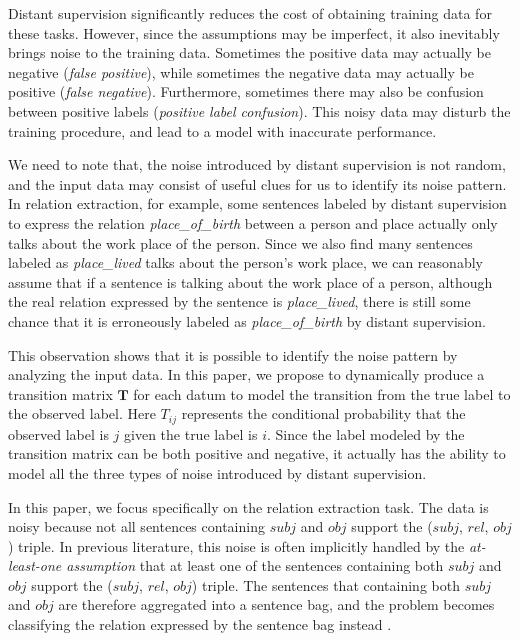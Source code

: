 
Distant supervision significantly reduces the cost of obtaining training data for these tasks. However, since the assumptions may be imperfect, it also inevitably brings noise to the training data.  Sometimes the positive data may actually be negative (\emph{false positive}), while sometimes the negative data may actually be positive (\emph{false negative}). Furthermore, sometimes there may also be confusion between positive labels (\emph{positive label confusion}). This noisy data may disturb the training procedure, and lead to a model with inaccurate performance.

We need to note that, the noise introduced by distant supervision is not random, and the input data may consist of useful clues for us to identify its noise pattern. In relation extraction, for example, some sentences labeled by distant supervision to express the relation \emph{place\_of\_birth} between a person and place actually only talks about the work place of the person. Since we also find many sentences labeled as \emph{place\_lived} talks about the person's work place, we can reasonably assume that if a sentence is talking about the work place of a person, although the real relation expressed by the sentence is \emph{place\_lived}, there is still some chance that it is erroneously labeled as \emph{place\_of\_birth} by distant supervision.

This observation shows that it is possible to identify the noise pattern by analyzing the input data. In this paper, we propose to dynamically produce a transition matrix $\mathbf{T}$ for each datum to model the transition from the true label to the observed label. Here $T_{ij}$ represents the conditional probability that the observed label is $j$ given the true label is $i$. Since the label modeled by the transition matrix can be both positive and negative, it actually has the ability to model all the three types of noise introduced by distant supervision.



In this paper, we focus specifically on the relation extraction task. The data is noisy because not all sentences containing $subj$ and $obj$ support the ($subj$, $rel$, $obj$) triple.  In previous literature, this noise is often implicitly handled by the \emph{at-least-one assumption} that at least one of the sentences containing both $subj$ and $obj$ support the ($subj$, $rel$, $obj$) triple. The  sentences that containing both $subj$ and $obj$ are therefore aggregated into a sentence bag, and the problem becomes classifying the relation expressed by the sentence bag instead \cite{riedel2010modeling,lin2016neural}.


